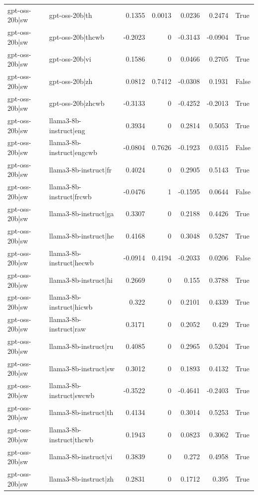 \begin{table}
\begin{tabular}{l l r r r r l}
gpt-oss-20b|sw & gpt-oss-20b|th & 0.1355 & 0.0013 & 0.0236 & 0.2474 & True \\
gpt-oss-20b|sw & gpt-oss-20b|thcwb & -0.2023 & 0 & -0.3143 & -0.0904 & True \\
gpt-oss-20b|sw & gpt-oss-20b|vi & 0.1586 & 0 & 0.0466 & 0.2705 & True \\
gpt-oss-20b|sw & gpt-oss-20b|zh & 0.0812 & 0.7412 & -0.0308 & 0.1931 & False \\
gpt-oss-20b|sw & gpt-oss-20b|zhcwb & -0.3133 & 0 & -0.4252 & -0.2013 & True \\
gpt-oss-20b|sw & llama3-8b-instruct|eng & 0.3934 & 0 & 0.2814 & 0.5053 & True \\
gpt-oss-20b|sw & llama3-8b-instruct|engcwb & -0.0804 & 0.7626 & -0.1923 & 0.0315 & False \\
gpt-oss-20b|sw & llama3-8b-instruct|fr & 0.4024 & 0 & 0.2905 & 0.5143 & True \\
gpt-oss-20b|sw & llama3-8b-instruct|frcwb & -0.0476 & 1 & -0.1595 & 0.0644 & False \\
gpt-oss-20b|sw & llama3-8b-instruct|ga & 0.3307 & 0 & 0.2188 & 0.4426 & True \\
gpt-oss-20b|sw & llama3-8b-instruct|he & 0.4168 & 0 & 0.3048 & 0.5287 & True \\
gpt-oss-20b|sw & llama3-8b-instruct|hecwb & -0.0914 & 0.4194 & -0.2033 & 0.0206 & False \\
gpt-oss-20b|sw & llama3-8b-instruct|hi & 0.2669 & 0 & 0.155 & 0.3788 & True \\
gpt-oss-20b|sw & llama3-8b-instruct|hicwb & 0.322 & 0 & 0.2101 & 0.4339 & True \\
gpt-oss-20b|sw & llama3-8b-instruct|raw & 0.3171 & 0 & 0.2052 & 0.429 & True \\
gpt-oss-20b|sw & llama3-8b-instruct|ru & 0.4085 & 0 & 0.2965 & 0.5204 & True \\
gpt-oss-20b|sw & llama3-8b-instruct|sw & 0.3012 & 0 & 0.1893 & 0.4132 & True \\
gpt-oss-20b|sw & llama3-8b-instruct|swcwb & -0.3522 & 0 & -0.4641 & -0.2403 & True \\
gpt-oss-20b|sw & llama3-8b-instruct|th & 0.4134 & 0 & 0.3014 & 0.5253 & True \\
gpt-oss-20b|sw & llama3-8b-instruct|thcwb & 0.1943 & 0 & 0.0823 & 0.3062 & True \\
gpt-oss-20b|sw & llama3-8b-instruct|vi & 0.3839 & 0 & 0.272 & 0.4958 & True \\
gpt-oss-20b|sw & llama3-8b-instruct|zh & 0.2831 & 0 & 0.1712 & 0.395 & True \\

\end{tabular}
\end{table}
